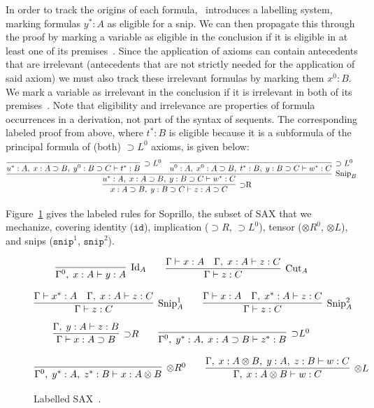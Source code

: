 In order to track the origins of each formula,~\cite{DeYoung2020} introduces a
labelling system, marking formulas $y^*: A$ as eligible for a snip. We can then
propagate this through the proof by marking a variable as eligible in the
conclusion if it is eligible in at least one of its
premises~\cite{DeYoung2020}. Since the application of axioms can contain
antecedents that are irrelevant (antecedents that are not strictly needed for
the application of said axiom) we must also track these irrelevant formulas by
marking them $x^0: B$. We mark a variable as irrelevant in the conclusion if it
is irrelevant in both of its premises~\cite{DeYoung2020}. Note that eligibility
and irrelevance are properties of formula occurrences in a derivation, not part
of the syntax of sequents. The corresponding labeled proof from above, where
$t^*: B$ is eligible because it is a subformula of the principal formula of
(both) $\supset L^0$ axioms, is given below:
\[
\infer[\text{$\supset$R}]{x : A \supset B,\; y : B \supset C \vdash z : A \supset C}{
  \infer[\text{Snip}_B]{u^* : A,\; x : A \supset B,\; y : B \supset C \vdash w^* : C}{
    \infer[\supset L^0]{u^* : A,\; x : A \supset B,\; y^0 : B \supset C \vdash t^* : B}{} &
    \infer[\supset L^0]{u^0 : A,\; x^0 : A \supset B,\; t^* : B,\; y : B \supset C \vdash w^* : C}{}
  }
}
\]

Figure~\ref{fig:sax-labelled} gives the labeled rules for Soprillo, the subset
of SAX that we mechanize, covering identity ($\texttt{id}$), implication
(${\supset}R$, ${\supset}L^0$), tensor (${\otimes}R^0$, ${\otimes}L$), and
snips ($\texttt{snip}^1$, $\texttt{snip}^2$).

\begin{figure}[ht!]
\[
  \infer[\text{Id}_A]{\Gamma^0,\; x : A \vdash y : A}{}
  \qquad
  \infer[\text{Cut}_A]{\Gamma \vdash z : C}{
    \Gamma \vdash x : A &
    \Gamma,\; x : A \vdash z : C
  }
\]

\[
  \infer[\text{Snip}_A^1]{\Gamma \vdash z : C}{
    \Gamma \vdash x^\ast : A &
    \Gamma,\; x : A \vdash z : C
  }
  \qquad
  \infer[\text{Snip}_A^2]{\Gamma \vdash z : C}{
    \Gamma \vdash x : A &
    \Gamma,\; x^\ast : A \vdash z : C
  }
\]
\[
  \infer[{\supset}R]{\Gamma \vdash x : A \supset B}{
    \Gamma,\; y : A \vdash z : B
  }
  \qquad
  \infer[{\supset}L^0]{\Gamma^0,\; y^\ast : A,\; x : A \supset B \vdash z^\ast : B}{}
\]

\[
  \infer[{\otimes}R^0]{\Gamma^0,\; y^\ast : A,\; z^\ast : B \vdash x : A \otimes B}{}
  \qquad
  \infer[{\otimes}L]{\Gamma,\; x : A \otimes B \vdash w : C}{
    \Gamma,\; x : A \otimes B,\; y : A,\; z : B \vdash w : C
  }
\]

\caption{Labelled SAX~\cite{DeYoung2020}.}
\label{fig:sax-labelled}
\end{figure}


